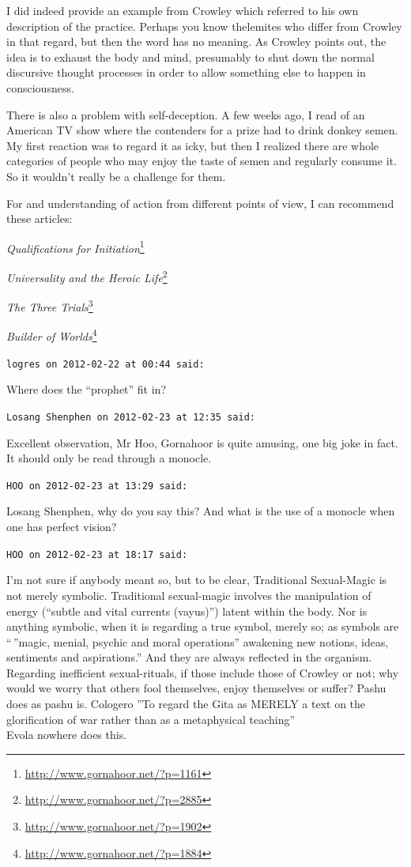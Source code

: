 \begin{footnotesize}
\begin{sffamily}
I did indeed provide an example from Crowley which referred to his own description of the practice. Perhaps you know thelemites who differ from Crowley in that regard, but then the word has no meaning. As Crowley points out, the idea is to exhaust the body and mind, presumably to shut down the normal discursive thought processes in order to allow something else to happen in consciousness.

There is also a problem with self-deception. A few weeks ago, I read of an American TV show where the contenders for a prize had to drink donkey semen. My first reaction was to regard it as icky, but then I realized there are whole categories of people who may enjoy the taste of semen and regularly consume it. So it wouldn't really be a challenge for them.

For and understanding of action from different points of view, I can recommend these articles:

\textit{Qualifications for Initiation}\footnote{\url{http://www.gornahoor.net/?p=1161}}

\textit{Universality and the Heroic Life}\footnote{\url{http://www.gornahoor.net/?p=2885}}

\textit{The Three Trials}\footnote{\url{http://www.gornahoor.net/?p=1902}}

\textit{Builder of Worlds}\footnote{\url{http://www.gornahoor.net/?p=1884}}


\hfill

\texttt{logres on 2012-02-22 at 00:44 said:}

Where does the ``prophet'' fit in?

\hfill

\texttt{Losang Shenphen on 2012-02-23 at 12:35 said:}

Excellent observation, Mr Hoo, Gornahoor is quite amusing, one big joke in fact. It should only be read through a monocle.

\hfill

\texttt{HOO on 2012-02-23 at 13:29 said:}

Losang Shenphen, why do you say this? And what is the use of a monocle when one has perfect vision?

\hfill

\texttt{HOO on 2012-02-23 at 18:17 said:}

I'm not sure if anybody meant so, but to be clear, Traditional Sexual-Magic is not merely symbolic. Traditional sexual-magic involves the manipulation of energy (``subtle and vital currents (vayus)'') latent within the body. Nor is anything symbolic, when it is regarding a true symbol, merely so; as symbols are ``\,''magic, menial, psychic and moral operations'' awakening new notions, ideas, sentiments and aspirations.'' And they are always reflected in the organism.\\ Regarding inefficient sexual-rituals, if those include those of Crowley or not; why would we worry that others fool themselves, enjoy themselves or suffer? Pashu does as pashu is. Cologero ''To regard the Gita as MERELY a text on the glorification of war rather than as a metaphysical teaching''\\ Evola nowhere does this.


\end{sffamily}
\end{footnotesize}
